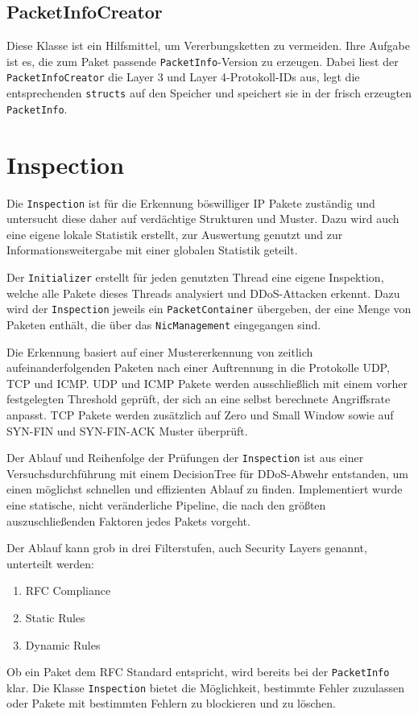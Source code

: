 \documentclass[../review_2.tex]{subfiles}
\begin{document}
\subsection{PacketInfoCreator}
Diese Klasse ist ein Hilfsmittel, um Vererbungsketten zu vermeiden. Ihre Aufgabe ist es, die zum Paket passende \texttt{PacketInfo}-Version zu erzeugen. Dabei liest der \texttt{PacketInfoCreator} die Layer 3 und Layer 4-Protokoll-IDs aus, legt die entsprechenden \texttt{structs} auf den Speicher und speichert sie in der frisch erzeugten \texttt{PacketInfo}.

\section{Inspection}
Die \texttt{Inspection} ist für die Erkennung böswilliger IP Pakete zuständig und untersucht diese daher auf verdächtige Strukturen und Muster. Dazu wird auch eine eigene lokale Statistik erstellt, zur Auswertung genutzt und zur Informationsweitergabe mit einer globalen Statistik geteilt.

Der \texttt{Initializer} erstellt für jeden genutzten Thread eine eigene Inspektion, welche alle Pakete dieses Threads analysiert und DDoS-Attacken erkennt. Dazu wird der \texttt{Inspection} jeweils ein \texttt{PacketContainer} übergeben, der eine Menge von Paketen enthält, die über das \texttt{NicManagement} eingegangen sind.

Die Erkennung basiert auf einer Mustererkennung von zeitlich aufeinanderfolgenden Paketen nach einer Auftrennung in die Protokolle UDP, TCP und ICMP. UDP und ICMP Pakete werden ausschließlich mit einem vorher festgelegten Threshold geprüft, der sich an eine selbst berechnete Angriffsrate anpasst. TCP Pakete werden zusätzlich auf Zero und Small Window sowie auf SYN-FIN und SYN-FIN-ACK Muster überprüft.

Der Ablauf und Reihenfolge der Prüfungen der \texttt{Inspection} ist aus einer Versuchsdurchführung mit einem DecisionTree für DDoS-Abwehr entstanden, um einen möglichst schnellen und effizienten Ablauf zu finden. Implementiert wurde eine statische, nicht veränderliche Pipeline, die nach den größten auszuschließenden Faktoren jedes Pakets vorgeht.

Der Ablauf kann grob in drei Filterstufen, auch Security Layers genannt, unterteilt werden:
\begin{enumerate}
    \item RFC Compliance
    \item Static Rules
    \item Dynamic Rules
\end{enumerate}
Ob ein Paket dem RFC Standard entspricht, wird bereits bei der \texttt{PacketInfo} klar. Die Klasse \texttt{Inspection} bietet die Möglichkeit, bestimmte Fehler zuzulassen oder Pakete mit bestimmten Fehlern zu blockieren und zu löschen.
\end{document}
